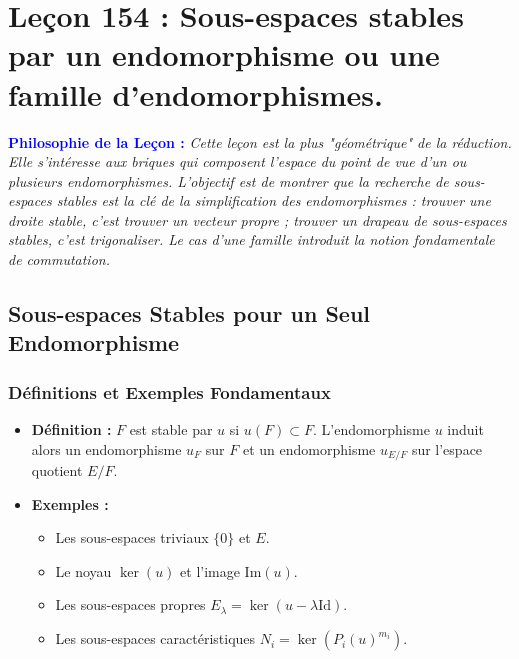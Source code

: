 \documentclass[12pt, a4paper, parskip=full]{report}
\theoremstyle{agregstyle}
\newenvironment{philosophie}
  {\par\medskip\noindent\begin{oframed}\noindent\textbf{\textcolor{blue}{Philosophie de la Leçon :}}\itshape}
  {\end{oframed}\par\medskip}
\begin{document}
\newpage
\chapter{Leçon 154 : Sous-espaces stables par un endomorphisme ou une famille d'endomorphismes.}

\begin{philosophie}
    Cette leçon est la plus "géométrique" de la réduction. Elle s'intéresse aux briques qui composent l'espace du point de vue d'un ou plusieurs endomorphismes. L'objectif est de montrer que la recherche de sous-espaces stables est la clé de la simplification des endomorphismes : trouver une droite stable, c'est trouver un vecteur propre ; trouver un drapeau de sous-espaces stables, c'est trigonaliser. Le cas d'une famille introduit la notion fondamentale de commutation.
\end{philosophie}

\section{Sous-espaces Stables pour un Seul Endomorphisme}

\subsection{Définitions et Exemples Fondamentaux}
\begin{itemize}
    \item \textbf{Définition :} $F$ est stable par $u$ si $u(F) \subset F$. L'endomorphisme $u$ induit alors un endomorphisme $u_F$ sur $F$ et un endomorphisme $u_{E/F}$ sur l'espace quotient $E/F$.
    \item \textbf{Exemples :}
        \begin{itemize}
            \item Les sous-espaces triviaux $\{0\}$ et $E$.
            \item Le noyau $\ker(u)$ et l'image $\mathrm{Im}(u)$.
            \item Les sous-espaces propres $E_\lambda = \ker(u-\lambda \mathrm{Id})$.
            \item Les sous-espaces caractéristiques $N_i = \ker(P_i(u)^{m_i})$.
        \end{itemize}
\end{itemize}
\end{document}
